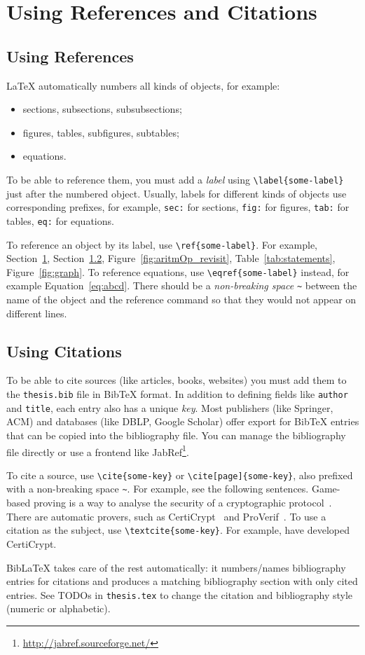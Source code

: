 \section{Using References and Citations}
\label{sec:refs-cites}

\subsection{Using References}
LaTeX automatically numbers all kinds of objects, for example:
\begin{itemize}
    \item sections, subsections, subsubsections;
    \item figures, tables, subfigures, subtables;
    \item equations.
\end{itemize}
To be able to reference them, you must add a \emph{label} using \verb|\label{some-label}| just after the numbered object.
Usually, labels for different kinds of objects use corresponding prefixes, for example, \verb|sec:| for sections, \verb|fig:| for figures, \verb|tab:| for tables, \verb|eq:| for equations.

To reference an object by its label, use \verb|\ref{some-label}|.
For example, Section~\ref{sec:refs-cites}, Section~\ref{sec:cites}, Figure~\ref{fig:aritmOp_revisit}, Table~\ref{tab:statements}, Figure~\ref{fig:graph}.
To reference equations, use \verb|\eqref{some-label}| instead, for example Equation~\eqref{eq:abcd}.
There should be a \emph{non-breaking space} \verb|~| between the name of the object and the reference command so that they would not appear on different lines.


\subsection{Using Citations}
\label{sec:cites}

To be able to cite sources (like articles, books, websites) you must add them to the \verb|thesis.bib| file in BibTeX format.
In addition to defining fields like \verb|author| and \verb|title|, each entry also has a unique \emph{key}.
Most publishers (like Springer, ACM) and databases (like DBLP, Google Scholar) offer export for BibTeX entries that can be copied into the bibliography file.
You can manage the bibliography file directly or use a frontend like JabRef\footnote{\url{http://jabref.sourceforge.net/}}.

To cite a source, use \verb|\cite{some-key}| or \verb|\cite[page]{some-key}|, also prefixed with a non-breaking space \verb|~|.
For example, see the following sentences.
Game-based proving is a way to analyse the security of a cryptographic protocol~\cite{GameB_1,GameB_2}.
There are automatic provers, such as CertiCrypt~\cite{certiCrypt} and ProVerif~\cite{proVerif}.
To use a citation as the subject, use \verb|\textcite{some-key}|.
For example, \textcite{certiCrypt} have developed CertiCrypt.

BibLaTeX takes care of the rest automatically: it numbers/names bibliography entries for citations and produces a matching bibliography section with only cited entries.
See TODOs in \verb|thesis.tex| to change the citation and bibliography style (numeric or alphabetic).
